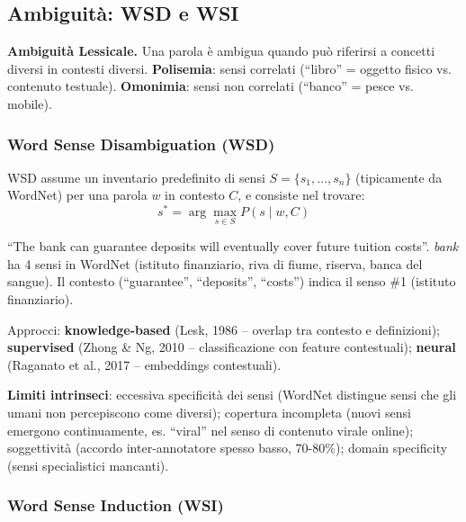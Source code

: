 \documentclass[12pt,a4paper]{article}
\begin{document}
\subsection{Ambiguit\`a: WSD e WSI}

\begin{defbox}
\textbf{Ambiguit\`a Lessicale.}
Una parola \`e ambigua quando pu\`o riferirsi a concetti diversi in contesti diversi. \textbf{Polisemia}: sensi correlati (``libro'' = oggetto fisico vs. contenuto testuale). \textbf{Omonimia}: sensi non correlati (``banco'' = pesce vs. mobile).
\end{defbox}

\subsubsection{Word Sense Disambiguation (WSD)}

\begin{formulabox}
WSD assume un inventario predefinito di sensi $S=\{s_1,\dots,s_n\}$ (tipicamente da WordNet) per una parola $w$ in contesto $C$, e consiste nel trovare:
\[
s^* = \arg\max_{s \in S} P(s \mid w, C)
\]
\end{formulabox}

\begin{examplebox}
``The bank can guarantee deposits will eventually cover future tuition costs''. \textit{bank} ha 4 sensi in WordNet (istituto finanziario, riva di fiume, riserva, banca del sangue). Il contesto (``guarantee'', ``deposits'', ``costs'') indica il senso \#1 (istituto finanziario).
\end{examplebox}

Approcci: \textbf{knowledge-based} (Lesk, 1986 -- overlap tra contesto e definizioni); \textbf{supervised} (Zhong \& Ng, 2010 -- classificazione con feature contestuali); \textbf{neural} (Raganato et al., 2017 -- embeddings contestuali).

\textbf{Limiti intrinseci}: eccessiva specificit\`a dei sensi (WordNet distingue sensi che gli umani non percepiscono come diversi); copertura incompleta (nuovi sensi emergono continuamente, es. ``viral'' nel senso di contenuto virale online); soggettivit\`a (accordo inter-annotatore spesso basso, 70-80\%); domain specificity (sensi specialistici mancanti).

\subsubsection{Word Sense Induction (WSI)}
\end{document}
